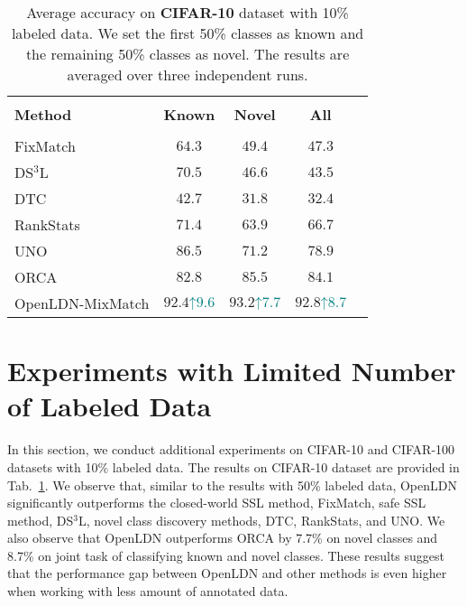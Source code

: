 \documentclass[runningheads]{eccv2022submission}
\begin{document}
\begin{table}[h]
\begin{center}\setlength{\tabcolsep}{2pt}
\small
\begin{tabular}{lcccc}
\hline

\hline

\hline\\[-3mm]
\textbf{Method} & \textbf{Known} & \textbf{Novel} & \textbf{All}\\
[-3mm]
\\
 \hline

\hline

\hline
FixMatch\cite{sohn2020fixmatch} & $64.3$ & $49.4$ & $47.3$\\
DS$^{3}$L\cite{guo2020safe} & $70.5$ & $46.6$ & $43.5$\\
DTC\cite{han2019learning} & $42.7$ & $31.8$ & $32.4$\\
RankStats\cite{Han2020Automatically} & $71.4$ & $63.9$ & $66.7$\\
UNO\cite{fini2021unified} & $86.5$ & $71.2$ & $78.9$\\
ORCA\cite{cao2022openworld} & $82.8$ & $85.5$ & $84.1$\\
\rowcolor[gray]{.95} {OpenLDN-MixMatch} & $\mathbf{92.4}${\tiny{\textcolor{teal}{$\mathord{\uparrow}9.6$}}} & $\mathbf{93.2}${\tiny{\textcolor{teal}{$\mathord{\uparrow}7.7$}}} & $\mathbf{92.8}${\tiny{\textcolor{teal}{$\mathord{\uparrow}8.7$}}}\\ 
\hline 

\hline

\hline
\end{tabular}
\end{center}
\caption{Average accuracy on \textbf{CIFAR-10}  dataset with 10\% labeled data. We set the first 50\% classes as known and the remaining 50\% classes as novel. The results are averaged over three independent runs.}
\label{tab:cifar10}
\end{table}


\section{Experiments with Limited Number of Labeled Data}
\label{sec:limited}
In this section, we conduct additional experiments on CIFAR-10 and CIFAR-100 datasets with 10\% labeled data. The results on CIFAR-10 dataset are provided in Tab.~\ref{tab:cifar10}. We observe that, similar to the results with 50\% labeled data, OpenLDN significantly outperforms the closed-world SSL method, FixMatch\cite{sohn2020fixmatch}, safe SSL method, DS$^3$L\cite{guo2020safe}, novel class discovery methods, DTC\cite{han2019learning}, RankStats\cite{Han2020Automatically}, and UNO\cite{fini2021unified}. We also observe that OpenLDN outperforms ORCA\cite{cao2022openworld} by 7.7\% on novel classes and 8.7\% on joint task of classifying known and novel classes. These results suggest that the performance gap between OpenLDN and other methods is even higher when working with less amount of annotated data.
\end{document}
